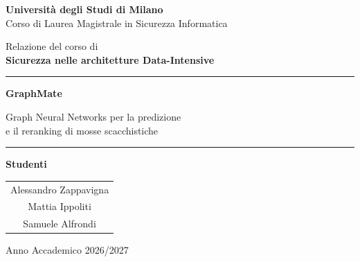 \documentclass[12pt,a4paper]{report}
\begin{document}
\hypersetup{pageanchor=false}


\begin{titlepage}
    \centering

    \vspace*{1cm}

    {\Large \textbf{Università degli Studi di Milano}}\\[0.4cm]

    {\large Corso di Laurea Magistrale in Sicurezza Informatica}

    \vspace{2cm}

    {\Large Relazione del corso di}\\[0.3cm]

    {\Large \textbf{Sicurezza nelle architetture Data-Intensive}}

    \vspace{1.5cm}

    \rule{\textwidth}{0.5pt}

    \vspace{0.5cm}

    {\Huge \textbf{GraphMate}}

    \vspace{0.3cm}

    {\Large Graph Neural Networks per la predizione\\[0.15cm]
    e il reranking di mosse scacchistiche}

    \vspace{0.5cm}

    \rule{\textwidth}{0.5pt}

\vfill

{\large\textbf{Studenti}}\\[0.5cm]

\begin{tabular}{c}
    Alessandro Zappavigna \\
    Mattia Ippoliti \\
    Samuele Alfrondi
\end{tabular}

\vfill

    {\large Anno Accademico 2026/2027}

\end{titlepage}

\end{document}
